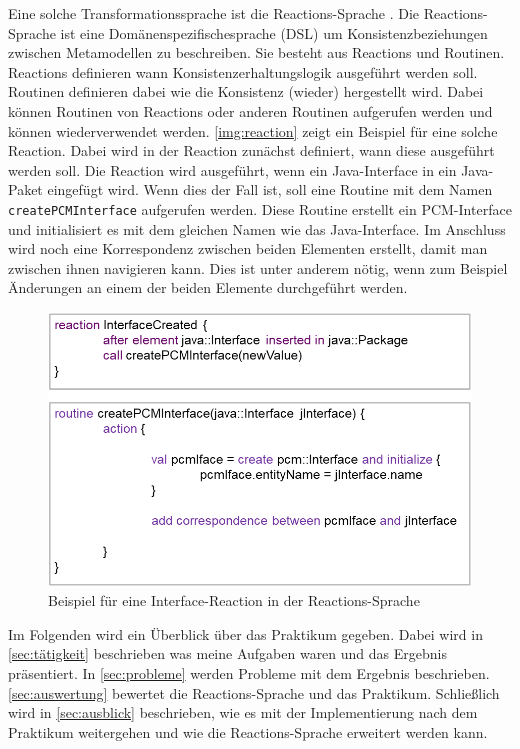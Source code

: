 \documentclass[ngerman,runningheads]{llncs}
\begin{document}
Eine solche Transformationssprache ist die Reactions-Sprache \cite{kramer2017a}. Die Reactions-Sprache ist eine Domänenspezifischesprache (DSL) um Konsistenzbeziehungen zwischen Metamodellen zu beschreiben. Sie besteht aus Reactions und Routinen. Reactions definieren wann Konsistenzerhaltungslogik ausgeführt werden soll. Routinen definieren dabei wie die Konsistenz (wieder) hergestellt wird. Dabei können Routinen von Reactions oder anderen Routinen aufgerufen werden und können wiederverwendet werden. \autoref{img:reaction} zeigt ein Beispiel für eine solche Reaction. Dabei wird in der Reaction zunächst definiert, wann diese ausgeführt werden soll. Die Reaction wird ausgeführt, wenn ein Java-Interface in ein Java-Paket eingefügt wird. Wenn dies der Fall ist, soll eine Routine mit dem Namen \texttt{createPCMInterface} aufgerufen werden. Diese Routine erstellt ein PCM-Interface und initialisiert es mit dem gleichen Namen wie das Java-Interface. Im Anschluss wird noch eine Korrespondenz zwischen beiden Elementen erstellt, damit man zwischen ihnen navigieren kann. Dies ist unter anderem nötig, wenn zum Beispiel Änderungen an einem der beiden Elemente durchgeführt werden.
\begin{figure}[htp]
	\centering
  	\includegraphics[width=1\textwidth]{images/reaction.png}
	\caption{Beispiel für eine Interface-Reaction in der Reactions-Sprache}
	\label{img:reaction}
\end{figure} \par
Im Folgenden wird ein Überblick über das Praktikum gegeben. Dabei wird in \autoref{sec:tätigkeit} beschrieben was meine Aufgaben waren und das Ergebnis präsentiert. In \autoref{sec:probleme} werden Probleme mit dem Ergebnis beschrieben. \autoref{sec:auswertung} bewertet die Reactions-Sprache und das Praktikum. Schließlich wird in \autoref{sec:ausblick} beschrieben, wie es mit der Implementierung nach dem Praktikum weitergehen und wie die Reactions-Sprache erweitert werden kann. 
\end{document}

